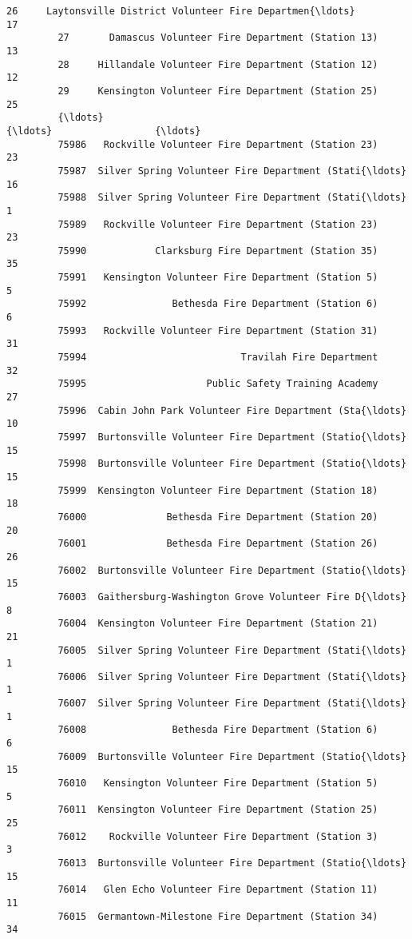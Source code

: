 \documentclass[11pt]{article}
\begin{document}
\begin{Verbatim}[commandchars=\\\{\}]
         26     Laytonsville District Volunteer Fire Departmen{\ldots}                   17   
         27       Damascus Volunteer Fire Department (Station 13)                   13   
         28     Hillandale Volunteer Fire Department (Station 12)                   12   
         29     Kensington Volunteer Fire Department (Station 25)                   25   
         {\ldots}                                                  {\ldots}                  {\ldots}   
         75986   Rockville Volunteer Fire Department (Station 23)                   23   
         75987  Silver Spring Volunteer Fire Department (Stati{\ldots}                   16   
         75988  Silver Spring Volunteer Fire Department (Stati{\ldots}                    1   
         75989   Rockville Volunteer Fire Department (Station 23)                   23   
         75990            Clarksburg Fire Department (Station 35)                   35   
         75991   Kensington Volunteer Fire Department (Station 5)                    5   
         75992               Bethesda Fire Department (Station 6)                    6   
         75993   Rockville Volunteer Fire Department (Station 31)                   31   
         75994                           Travilah Fire Department                   32   
         75995                     Public Safety Training Academy                   27   
         75996  Cabin John Park Volunteer Fire Department (Sta{\ldots}                   10   
         75997  Burtonsville Volunteer Fire Department (Statio{\ldots}                   15   
         75998  Burtonsville Volunteer Fire Department (Statio{\ldots}                   15   
         75999  Kensington Volunteer Fire Department (Station 18)                   18   
         76000              Bethesda Fire Department (Station 20)                   20   
         76001              Bethesda Fire Department (Station 26)                   26   
         76002  Burtonsville Volunteer Fire Department (Statio{\ldots}                   15   
         76003  Gaithersburg-Washington Grove Volunteer Fire D{\ldots}                    8   
         76004  Kensington Volunteer Fire Department (Station 21)                   21   
         76005  Silver Spring Volunteer Fire Department (Stati{\ldots}                    1   
         76006  Silver Spring Volunteer Fire Department (Stati{\ldots}                    1   
         76007  Silver Spring Volunteer Fire Department (Stati{\ldots}                    1   
         76008               Bethesda Fire Department (Station 6)                    6   
         76009  Burtonsville Volunteer Fire Department (Statio{\ldots}                   15   
         76010   Kensington Volunteer Fire Department (Station 5)                    5   
         76011  Kensington Volunteer Fire Department (Station 25)                   25   
         76012    Rockville Volunteer Fire Department (Station 3)                    3   
         76013  Burtonsville Volunteer Fire Department (Statio{\ldots}                   15   
         76014   Glen Echo Volunteer Fire Department (Station 11)                   11   
         76015  Germantown-Milestone Fire Department (Station 34)                   34   
         

\end{Verbatim}
\end{document}
